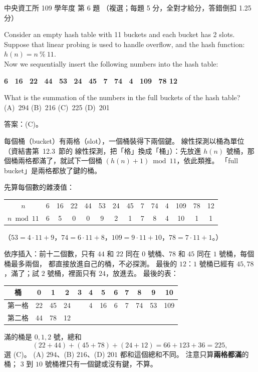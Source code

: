\begin{pastexam}[label={px:ncu-109-dsa-06}]{中央資工所 109 學年度 第 6 題}
（複選；每題 5 分，全對才給分，答錯倒扣 1.25 分）

Consider an empty hash table with 11 buckets and each bucket has 2 slots. Suppose that linear
probing is used to handle overflow, and the hash function: $h(n)=n\ \%\ 11$.\\
Now we sequentially insert the following numbers into the hash table:
\begin{center}\textbf{6 \ 16 \ 22 \ 44 \ 53 \ 24 \ 45 \ 7 \ 74 \ 4 \ 109 \ 78 12}\end{center}
What is the summation of the numbers in the full buckets of the hash table?\\
(A)~294 \qquad (B)~216 \qquad (C)~225 \qquad (D)~201
\end{pastexam}

\begin{pastsoln}
答案：(C)。

每個桶（bucket）有兩格（slot），一個桶裝得下兩個鍵。 線性探測以桶為單位（資結書第~12.3~節的
線性探測，把「格」換成「桶」）：先放進 $h(n)$ 號桶，那個桶兩格都滿了，就試下一個桶
$(h(n) + 1) \bmod 11$，依此類推。 「full bucket」是兩格都放了鍵的桶。

先算每個數的雜湊值：
\begin{center}
\small
\begin{tabular}{c*{13}{c}}
\toprule
$n$ & 6 & 16 & 22 & 44 & 53 & 24 & 45 & 7 & 74 & 4 & 109 & 78 & 12 \\
$n \bmod 11$ & 6 & 5 & 0 & 0 & 9 & 2 & 1 & 7 & 8 & 4 & 10 & 1 & 1 \\
\bottomrule
\end{tabular}
\end{center}
（$53 = 4 \cdot 11 + 9$，$74 = 6 \cdot 11 + 8$，$109 = 9 \cdot 11 + 10$，$78 = 7 \cdot 11 + 1$。）

依序插入：前十二個數，只有 $44$ 和 $22$ 同在 $0$ 號桶、$78$ 和 $45$ 同在 $1$ 號桶，每個桶最多兩個，
都直接放進自己的桶，不必探測。 最後的 $12$：$1$ 號桶已經有 $45, 78$，滿了；試 $2$ 號桶，裡面只有
$24$，放進去。 最後的表：
\begin{center}
\small
\begin{tabular}{c*{11}{c}}
\toprule
桶 & 0 & 1 & 2 & 3 & 4 & 5 & 6 & 7 & 8 & 9 & 10 \\
\midrule
第一格 & 22 & 45 & 24 & & 4 & 16 & 6 & 7 & 74 & 53 & 109 \\
第二格 & 44 & 78 & 12 & & & & & & & & \\
\bottomrule
\end{tabular}
\end{center}

滿的桶是 $0, 1, 2$ 號，總和
\[
(22 + 44) + (45 + 78) + (24 + 12) = 66 + 123 + 36 = 225,
\]
選 (C)。 (A) $294$、(B) $216$、(D) $201$ 都和這個總和不同。 注意只算\textbf{兩格都滿}的桶；
$3$ 到 $10$ 號桶裡只有一個鍵或沒有鍵，不算。
\end{pastsoln}
